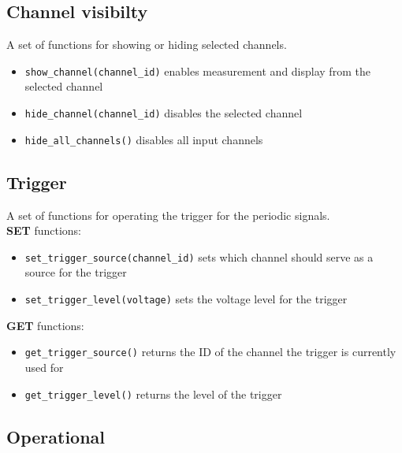 \subsection*{Channel visibilty}

A set of functions for showing or hiding selected channels.

\begin{itemize}
    
    \item \verb|show_channel(channel_id)| enables measurement and display from the selected channel
    \item \verb|hide_channel(channel_id)| disables the selected channel
    \item \verb|hide_all_channels()| disables all input channels

\end{itemize}

\subsection*{Trigger}

A set of functions for operating the trigger for the periodic signals.\\

\noindent\textbf{SET} functions:

\begin{itemize}
    
    \item \verb|set_trigger_source(channel_id)| sets which channel should serve as a source for the trigger
    \item \verb|set_trigger_level(voltage)| sets the voltage level for the trigger

\end{itemize}

\noindent\textbf{GET} functions:

\begin{itemize}
    
    \item \verb|get_trigger_source()| returns the ID of the channel the trigger is currently used for
    \item \verb|get_trigger_level()| returns the level of the trigger

\end{itemize}

\subsection*{Operational}

